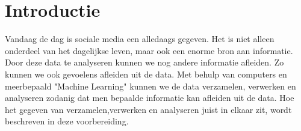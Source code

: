 \section{Introductie}\label{introductie}
Vandaag de dag is sociale media een alledaags gegeven. Het is niet alleen onderdeel van het dagelijkse leven, maar ook een enorme bron aan informatie.
Door deze data te analyseren kunnen we nog andere informatie afleiden. Zo kunnen we ook gevoelens afleiden uit de data. Met behulp van computers en meerbepaald "Machine Learning" kunnen we de data verzamelen, verwerken en analyseren zodanig dat men bepaalde informatie kan afleiden uit de data.
Hoe het gegeven van verzamelen,verwerken en analyseren juist in elkaar zit, wordt beschreven in deze voorbereiding.



